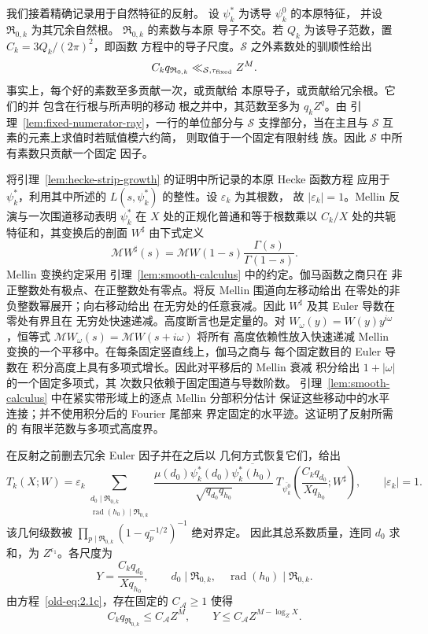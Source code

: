 我们接着精确记录用于自然特征的反射。
设 \(\psi_k^*\) 为诱导 \(\psi_k^0\) 的本原特征，
并设 \(\mathfrak R_{0,k}\) 为其冗余自然根。
\(\mathfrak R_{0,k}\) 的素数与本原
导子不交。若 \(Q_k\) 为该导子范数，置
\(C_k=3Q_k/(2\pi)^2\)，即函数
方程中的导子尺度。\(\mathcal S\) 之外素数处的驯顺性给出
\begin{equation}
 C_kq_{\mathfrak R_{0,k}}
 \ll_{\mathcal S,\tau_{\rm fixed}} Z^M.
 \label{old-eq:2.1c}
\end{equation}
事实上，每个好的素数至多贡献一次，或贡献给
本原导子，或贡献给冗余根。它们的并
包含在行根与所声明的移动
根之并中，其范数至多为 \(q_kZ^q\)。由
引理~\ref{lem:fixed-numerator-ray}，一行的单位部分与
\(\mathcal S\) 支撑部分，当在主且与 \(\mathcal S\) 互素的元素上求值时若赋值模六约简，
则取值于一个固定有限射线
族。因此 \(\mathcal S\) 中所有素数只贡献一个固定
因子。

将引理~\ref{lem:hecke-strip-growth} 的证明中所记录的本原 Hecke 函数方程
应用于 \(\psi_k^*\)，利用其中所述的
\(L(s,\psi_k^*)\) 的整性。设 \(\varepsilon_k\) 为其根数，
故 \(|\varepsilon_k|=1\)。Mellin 反演与一次围道移动表明
\(\psi_k^*\) 在 \(X\) 处的正规化普通和等于根数乘以
\(C_k/X\) 处的共轭
特征和，其变换后的剖面 \(W^\sharp\)
由下式定义
\[
 \mathcal M W^\sharp(s)
 =\mathcal M W(1-s)\frac{\Gamma(s)}{\Gamma(1-s)}.
\]
Mellin 变换约定采用
引理~\ref{lem:smooth-calculus} 中的约定。伽马函数之商只在
非正整数处有极点、在正整数处有零点。将反 Mellin 围道向左移动给出
在零处的非负整数幂展开；向右移动给出
在无穷处的任意衰减。因此 \(W^\sharp\) 及其
Euler 导数在零处有界且在
无穷处快速递减。高度断言也是定量的。对
\(W_\omega(y)=W(y)y^{i\omega}\)，恒等式
\(\mathcal M W_\omega(s)=\mathcal M W(s+i\omega)\) 将所有
高度依赖性放入快速递减 Mellin
变换的一个平移中。在每条固定竖直线上，伽马之商与
每个固定数目的 Euler 导数在
积分高度上具有多项式增长。因此对平移后的 Mellin 衰减
积分给出 \(1+|\omega|\) 的一个固定多项式，其
次数只依赖于固定围道与导数阶数。
引理~\ref{lem:smooth-calculus} 中在紧实带形域上的逐点 Mellin 分部积分估计
保证这些移动中的水平
连接；并不使用积分后的 Fourier 尾部来
界定固定的水平迹。这证明了反射所需的
有限半范数与多项式高度界。

在反射之前删去冗余 Euler 因子并在之后以
几何方式恢复它们，给出
\[
 T_k(X;W)
 =\varepsilon_k
 \sum_{\substack{d_0\mid\mathfrak R_{0,k}\\
                  \operatorname{rad}(h_0)\mid\mathfrak R_{0,k}}}
 \frac{\mu(d_0)\psi_k^*(d_0)\overline{\psi_k^*(h_0)}}
      {\sqrt{q_{d_0}q_{h_0}}}\,
 T_{\overline{\psi_k^0}}
   \left(\frac{C_kq_{d_0}}{Xq_{h_0}};W^\sharp\right),
 \qquad |\varepsilon_k|=1.
\]
该几何级数被
\(\prod_{p\mid\mathfrak R_{0,k}}(1-q_p^{-1/2})^{-1}\) 绝对界定。
因此其总系数质量，连同 \(d_0\)
求和，为 \(Z^{\epsilon_1}\)。各尺度为
\begin{equation}
 Y=\frac{C_kq_{d_0}}{Xq_{h_0}},\qquad
 d_0\mid\mathfrak R_{0,k},\quad
 \operatorname{rad}(h_0)\mid\mathfrak R_{0,k}.
 \label{old-eq:2.1d}
\end{equation}
由方程~\eqref{old-eq:2.1c}，存在固定的 \(C_{\mathcal A}\ge1\)
使得
\[
 C_kq_{\mathfrak R_{0,k}}\le C_{\mathcal A}Z^M,\qquad
 Y\le C_{\mathcal A}Z^{M-\log_ZX}.
\]

